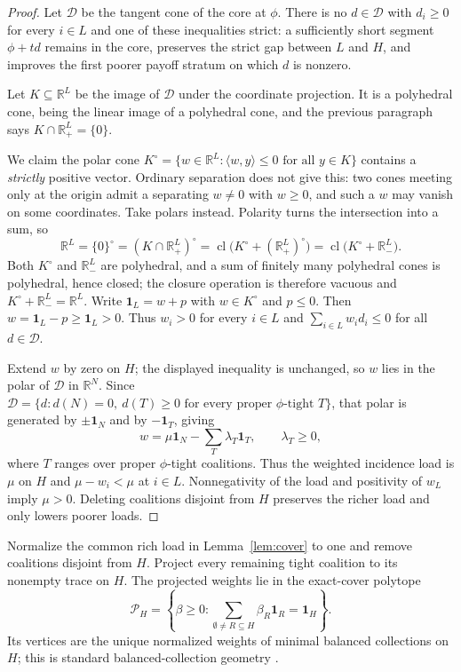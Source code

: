 \documentclass[11pt]{article}
\newcommand{\one}{\mathbf 1}
\begin{document}
\begin{proof}
Let $\mathcal D$ be the tangent cone of the core at $\phi$.  There is no
$d\in\mathcal D$ with $d_i\ge0$ for every $i\in L$ and one of these
inequalities strict: a sufficiently short segment $\phi+td$ remains in the
core, preserves the strict gap between $L$ and $H$, and improves the first
poorer payoff stratum on which $d$ is nonzero.

Let $K\subseteq\mathbb R^L$ be the image of $\mathcal D$ under the coordinate
projection.  It is a polyhedral cone, being the linear image of a polyhedral
cone, and the previous paragraph says $K\cap\mathbb R_+^L=\{0\}$.

We claim the polar cone
$K^\circ=\{w\in\mathbb R^L:\langle w,y\rangle\le0\text{ for all }y\in K\}$
contains a \emph{strictly} positive vector.  Ordinary separation does not
give this: two cones meeting only at the origin admit a separating $w\ne0$
with $w\ge0$, and such a $w$ may vanish on some coordinates.  Take polars
instead.  Polarity turns the intersection into a sum, so
\[
 \mathbb R^L=\{0\}^\circ=(K\cap\mathbb R_+^L)^\circ
  =\operatorname{cl}\bigl(K^\circ+(\mathbb R_+^L)^\circ\bigr)
  =\operatorname{cl}\bigl(K^\circ+\mathbb R_-^L\bigr).
\]
Both $K^\circ$ and $\mathbb R_-^L$ are polyhedral, and a sum of finitely many
polyhedral cones is polyhedral, hence closed; the closure operation is
therefore vacuous and $K^\circ+\mathbb R_-^L=\mathbb R^L$.  Write
$\one_L=w+p$ with $w\in K^\circ$ and $p\le0$.  Then $w=\one_L-p\ge\one_L>0$.
Thus $w_i>0$ for every $i\in L$ and
$\sum_{i\in L}w_id_i\le0$ for all $d\in\mathcal D$.

Extend $w$ by zero on $H$; the displayed inequality is unchanged, so $w$ lies
in the polar of $\mathcal D$ in $\mathbb R^N$.  Since
$\mathcal D=\{d:d(N)=0,\ d(T)\ge0\text{ for every proper }\phi\text{-tight }T\}$,
that polar is generated by $\pm\one_N$ and by $-\one_T$, giving
\[
 w=\mu\one_N-\sum_T\lambda_T\one_T,
 \qquad \lambda_T\ge0,                              \tag{NC}
\]
where $T$ ranges over proper $\phi$-tight coalitions.  Thus the weighted
incidence load is $\mu$ on $H$ and $\mu-w_i<\mu$ at $i\in L$.  Nonnegativity
of the load and positivity of $w_L$ imply $\mu>0$.  Deleting coalitions
disjoint from $H$ preserves the richer load and only lowers poorer loads.
\end{proof}

Normalize the common rich load in Lemma~\ref{lem:cover} to one and remove
coalitions disjoint from $H$.  Project every remaining tight coalition to
its nonempty trace on $H$.  The projected weights lie in the exact-cover
polytope
\[
 \mathcal P_H=\left\{\beta\ge0:
   \sum_{\emptyset\ne R\subseteq H}\beta_R\one_R=\one_H\right\}.
                                                               \tag{2}
\]
Its vertices are the unique normalized weights of minimal balanced
collections on $H$; this is standard balanced-collection geometry
\citep{LohmannBormHerings2012,LaplaceMermoudEtAl2025}.
\end{document}

